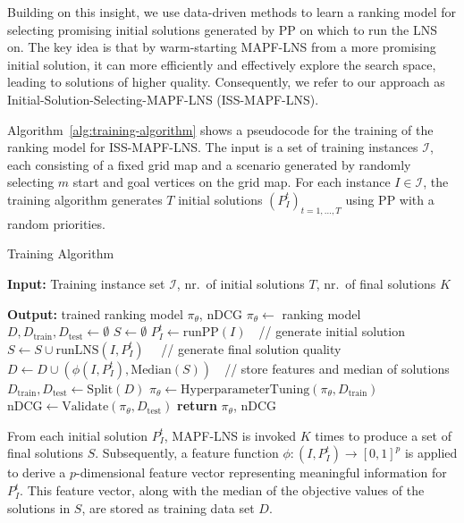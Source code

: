 \documentclass[runningheads]{llncs}
\begin{document}
Building on this insight, we use data-driven methods to learn a ranking model for selecting promising initial solutions generated by PP on which to run the LNS on. The key idea is that by warm-starting MAPF-LNS from a more promising initial solution, it can more efficiently and effectively explore the search space, leading to solutions of higher quality. Consequently, we refer to our approach as Initial-Solution-Selecting-MAPF-LNS (ISS-MAPF-LNS).

Algorithm~\ref{alg:training-algorithm} shows a pseudocode for the training of the ranking model for ISS-MAPF-LNS. The input is a set of training instances $\mathcal{I}$, each consisting of a fixed grid map and a scenario generated by randomly selecting $m$ start and goal vertices on the grid map. For each instance $I \in \mathcal{I}$, the training algorithm generates $T$ initial solutions $(P_I^t)_{t=1,\ldots, T}$ using PP with a random priorities.

\begin{algorithm}[!t] 
\caption{Training Algorithm}\label{alg:training-algorithm}
\begin{algorithmic}[1]
\State \textbf{Input:} Training instance set $\mathcal{I}$, nr.~of initial solutions $T$, nr.~of final solutions $K$

\State \textbf{Output:} trained ranking model $\pi_\theta$, nDCG
\State $\pi_\theta \leftarrow$ ranking model
\State $D, D_\mathrm{train}, D_\mathrm{test} \leftarrow \emptyset$
        \State $S \leftarrow \emptyset$
        \State $P_I^t \leftarrow \mathrm{runPP}(I)$~~// generate initial solution
    	    \State $S \leftarrow S \cup \mathrm{runLNS}(I,P_I^t)$ ~~// generate final solution quality
        \EndFor
        \State $D \leftarrow D \cup (\phi(I,P_I^t),\mathrm{Median}(S))$~~// store features and median of solutions
    \EndFor
\EndFor
\State $D_\mathrm{train}, D_\mathrm{test} \leftarrow \mathrm{Split}(D)$
\State $\pi_\theta \leftarrow \mathrm{HyperparameterTuning}(\pi_\theta, D_\mathrm{train})$ 
\State $\mathrm{nDCG} \leftarrow\mathrm{Validate}(\pi_\theta,D_\mathrm{test}) $
\State \textbf{return} $\pi_\theta$, nDCG
\end{algorithmic}
\end{algorithm}

From each initial solution $P_I^t$, MAPF-LNS is invoked $K$ times to produce a set of final solutions $S$. Subsequently, a feature function $\phi:(I,P_I^t)\rightarrow [0,1]^p$ is applied to derive a $p$-dimensional feature vector representing meaningful information for $P_I^t$. This feature vector, along with the median of the objective values of the solutions in $S$, are stored as training data set $D$. 
\end{document}
